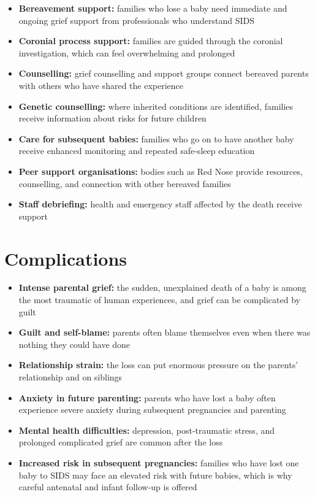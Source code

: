\begin{itemize}
    \item \textbf{Bereavement support:} families who lose a baby need immediate and ongoing grief support from professionals who understand SIDS
    \item \textbf{Coronial process support:} families are guided through the coronial investigation, which can feel overwhelming and prolonged
    \item \textbf{Counselling:} grief counselling and support groups connect bereaved parents with others who have shared the experience
    \item \textbf{Genetic counselling:} where inherited conditions are identified, families receive information about risks for future children
    \item \textbf{Care for subsequent babies:} families who go on to have another baby receive enhanced monitoring and repeated safe-sleep education
    \item \textbf{Peer support organisations:} bodies such as Red Nose provide resources, counselling, and connection with other bereaved families
    \item \textbf{Staff debriefing:} health and emergency staff affected by the death receive support
\end{itemize}

\section*{Complications}
\begin{itemize}
    \item \textbf{Intense parental grief:} the sudden, unexplained death of a baby is among the most traumatic of human experiences, and grief can be complicated by guilt
    \item \textbf{Guilt and self-blame:} parents often blame themselves even when there was nothing they could have done
    \item \textbf{Relationship strain:} the loss can put enormous pressure on the parents' relationship and on siblings
    \item \textbf{Anxiety in future parenting:} parents who have lost a baby often experience severe anxiety during subsequent pregnancies and parenting
    \item \textbf{Mental health difficulties:} depression, post-traumatic stress, and prolonged complicated grief are common after the loss
    \item \textbf{Increased risk in subsequent pregnancies:} families who have lost one baby to SIDS may face an elevated risk with future babies, which is why careful antenatal and infant follow-up is offered
\end{itemize}

